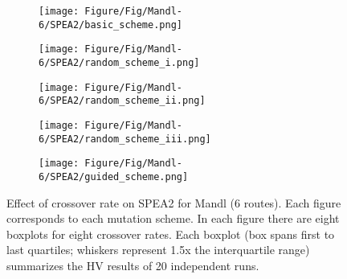 \begin{figure}[!htbp]
	\centering
	\begin{subfigure}[b]{0.52\textwidth}
		\texttt{[image: Figure/Fig/Mandl-6/SPEA2/basic\_scheme.png]}
	\end{subfigure}%
	\begin{subfigure}[b]{0.52\textwidth}
		\texttt{[image: Figure/Fig/Mandl-6/SPEA2/random\_scheme\_i.png]}
	\end{subfigure}%
	\newline
	\begin{subfigure}[b]{0.52\textwidth}
		\texttt{[image: Figure/Fig/Mandl-6/SPEA2/random\_scheme\_ii.png]}
	\end{subfigure}%
	\begin{subfigure}[b]{0.52\textwidth}
		\texttt{[image: Figure/Fig/Mandl-6/SPEA2/random\_scheme\_iii.png]}
	\end{subfigure}%
	\newline
	\begin{subfigure}[b]{0.52\textwidth}
		\texttt{[image: Figure/Fig/Mandl-6/SPEA2/guided\_scheme.png]}
	\end{subfigure}%
	\caption{Effect of crossover rate on SPEA2 for Mandl (6 routes). Each figure corresponds to each mutation scheme. In each figure there are eight boxplots for eight crossover rates.  Each boxplot (box spans first to last quartiles; whiskers represent 1.5x the interquartile range) summarizes the HV results of 20 independent runs.}
	\label{fig:cr_mandl6_spea2}
\end{figure}
